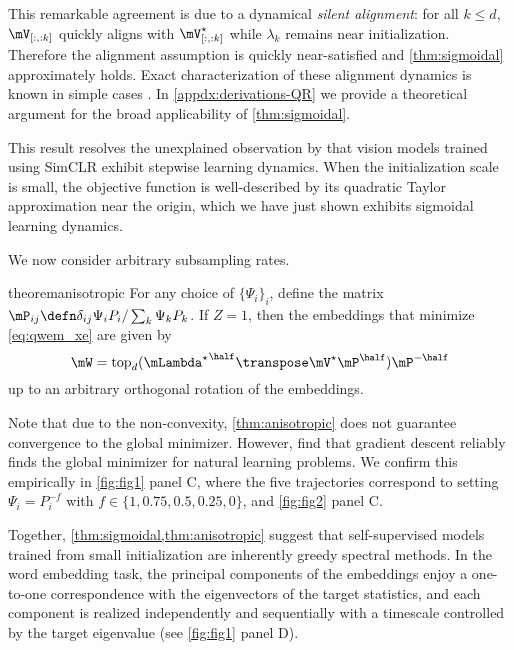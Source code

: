 This remarkable agreement is due to a dynamical \textit{silent alignment}: for all $k\leq d$, $\mV_{[:,:k]}$ quickly aligns with $\mV^\star_{[:,:k]}$ while $\lambda_k$ remains near initialization. Therefore the alignment assumption is quickly near-satisfied and \cref{thm:sigmoidal} approximately holds. Exact characterization of these alignment dynamics is known in simple cases \citep{atanasov2022neural, domine2023exact}.
In \cref{appdx:derivations-QR} we provide a theoretical argument for the broad applicability of \cref{thm:sigmoidal}.

This result resolves the unexplained observation by \cite{simon2023stepwise} that vision models trained using SimCLR exhibit stepwise learning dynamics. When the initialization scale is small, the objective function is well-described by its quadratic Taylor approximation near the origin, which we have just shown exhibits sigmoidal learning dynamics.
\newpage

We now consider arbitrary subsampling rates.

\begin{restatable}{theorem}{anisotropic}
    \label{thm:anisotropic}
    For any choice of $\{\Psi_i\}_i$, define the matrix $\mP_{ij}\defn \delta_{ij} \Psi_i P_i/\sum_k \Psi_k P_k$. If $Z=1$, then the embeddings that minimize \cref{eq:qwem_xe} are given by
    \begin{equation}
        \mW = \mathrm{top}_d({\Lstar}^\half \T{\mV^\star} \mP^\half) \mP^{-\half}
        \label{eq:qwem_anisotropic_sol_W}
    \end{equation}
    up to an arbitrary orthogonal rotation of the embeddings.
\end{restatable}
Note that due to the non-convexity, \cref{thm:anisotropic} does not guarantee convergence to the global minimizer. However, \cite{srebro2003weighted} find that gradient descent reliably finds the global minimizer for natural learning problems. We confirm this empirically in \cref{fig:fig1} panel C, where the five trajectories correspond to setting $\Psi_i=P_i^{-f}$ with $f\in\{1, 0.75, 0.5, 0.25, 0\}$, and \cref{fig:fig2} panel C.

Together, \cref{thm:sigmoidal,thm:anisotropic} suggest that self-supervised models trained from small initialization are inherently greedy spectral methods. In the word embedding task, the principal components of the embeddings enjoy a one-to-one correspondence with the eigenvectors of the target statistics, and each component is realized independently and sequentially with a timescale controlled by the target eigenvalue (see \cref{fig:fig1} panel D).

